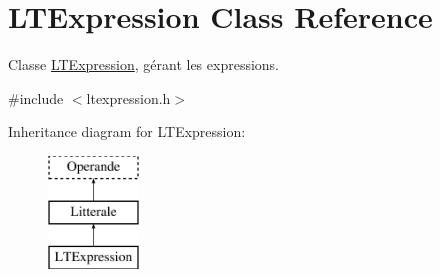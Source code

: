 \hypertarget{class_l_t_expression}{}\section{L\+T\+Expression Class Reference}
\label{class_l_t_expression}


Classe \hyperlink{class_l_t_expression}{L\+T\+Expression}, gérant les expressions.  




{\ttfamily \#include $<$ltexpression.\+h$>$}

Inheritance diagram for L\+T\+Expression\+:\begin{figure}[H]
\begin{center}
\leavevmode
\includegraphics[height=3.000000cm]{class_l_t_expression}
\end{center}
\end{figure}
